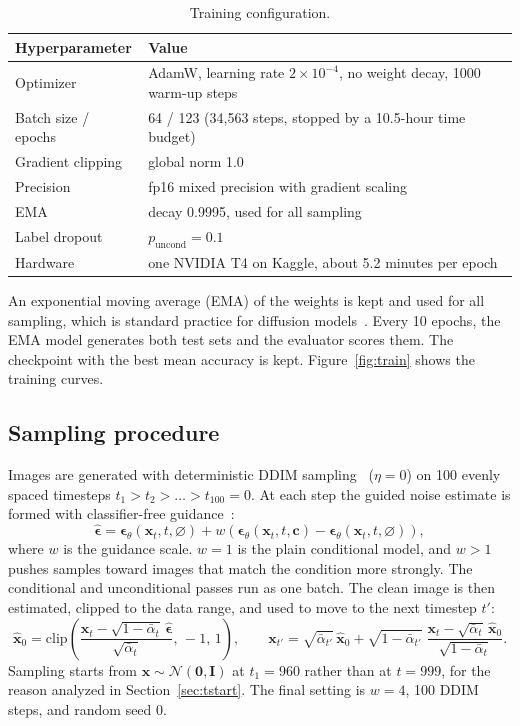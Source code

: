 \documentclass[11pt]{article}
\newcommand{\abar}{\bar{\alpha}}
\newcommand{\eps}{\boldsymbol{\epsilon}}
\newcommand{\x}{\mathbf{x}}
\newcommand{\cvec}{\mathbf{c}}
\begin{document}
\begin{table}[H]
\centering\small
\begin{tabular}{ll}
\toprule
Hyperparameter & Value \\
\midrule
Optimizer & AdamW, learning rate $2\times10^{-4}$, no weight decay, 1000 warm-up steps \\
Batch size / epochs & 64 / 123 (34,563 steps, stopped by a 10.5-hour time budget) \\
Gradient clipping & global norm 1.0 \\
Precision & fp16 mixed precision with gradient scaling \\
EMA & decay 0.9995, used for all sampling \\
Label dropout & $p_\text{uncond}=0.1$ \\
Hardware & one NVIDIA T4 on Kaggle, about 5.2 minutes per epoch \\
\bottomrule
\end{tabular}
\caption{Training configuration.}
\label{tab:train}
\end{table}

An exponential moving average (EMA) of the weights is kept and used for all sampling,
which is standard practice for diffusion models~\cite{ho2020}. Every 10 epochs, the
EMA model generates both test sets and the evaluator scores them. The checkpoint with the
best mean accuracy is kept. Figure~\ref{fig:train} shows the training curves.

\subsection{Sampling procedure}
Images are generated with deterministic DDIM sampling~\cite{song2021ddim} ($\eta=0$) on
100 evenly spaced timesteps $t_1>t_2>\dots>t_{100}=0$. At each step the guided noise
estimate is formed with classifier-free guidance~\cite{ho2022cfg}:
\begin{equation}
\hat{\eps}=\eps_\theta(\x_t,t,\varnothing)+w\left(\eps_\theta(\x_t,t,\cvec)-\eps_\theta(\x_t,t,\varnothing)\right),
\end{equation}
where $w$ is the guidance scale. $w=1$ is the plain conditional model, and $w>1$ pushes
samples toward images that match the condition more strongly. The conditional and
unconditional passes run as one batch. The clean image is then estimated, clipped to the
data range, and used to move to the next timestep $t'$:
\begin{equation}
\hat{\x}_0=\mathrm{clip}\!\left(\frac{\x_t-\sqrt{1-\abar_t}\,\hat{\eps}}{\sqrt{\abar_t}},\,-1,\,1\right),
\qquad
\x_{t'}=\sqrt{\abar_{t'}}\,\hat{\x}_0+\sqrt{1-\abar_{t'}}\;\frac{\x_t-\sqrt{\abar_t}\,\hat{\x}_0}{\sqrt{1-\abar_t}} .
\end{equation}
Sampling starts from $\x\sim\mathcal{N}(\mathbf{0},\mathbf{I})$ at $t_1=960$ rather than
at $t=999$, for the reason analyzed in Section~\ref{sec:tstart}. The final setting is
$w=4$, 100 DDIM steps, and random seed 0.
\end{document}
